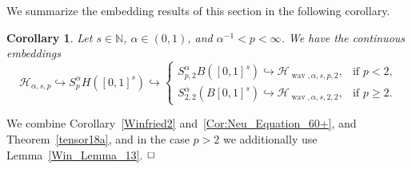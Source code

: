 \documentclass[12pt]{article}
\DeclareMathOperator{\wav}{wav}
\newtheorem{corollary}{Corollary}
\newtheorem{remark}{Remark}
\newenvironment{proof}{\begin{trivlist}
    \item[\hskip\labelsep{\it Proof.}]}{$\hfill\Box$\end{trivlist}}
\newcommand{\HH}{\mathcal{H}}
\newcommand{\N}{\mathbb{N}}
\newcommand{\mig}[1]{\textcolor{blue}{#1}}
\begin{document}

We summarize the embedding results of this section in the following corollary.

\begin{corollary}\label{DirEmb_Multi}
Let $s\in\N$, $\alpha\in (0, 1)$, and $\alpha^{-1} < p  < \infty$. We have the continuous embeddings
\begin{equation}\label{multivariate_embedding_series}
\mathcal{H}_{\alpha, s, p} \hookrightarrow S^\alpha_{p}H([0,1]^s)
\hookrightarrow 
\begin{cases}
S^\alpha_{p, 2}B([0,1]^s) \hookrightarrow \HH_{\wav,\alpha, s, p, 2}, & \text{if $p < 2$,}\\
S^\alpha_{2, 2}(B[0,1]^s) \hookrightarrow \HH_{\wav,\alpha, s, 2, 2}, & \text{if $p \ge 2$.}
\end{cases}
\end{equation}
\end{corollary}

\begin{proof}
We combine
Corollary~\ref{Winfried2} and~\ref{Cor:Neu_Equation_60+}, and Theorem~\ref{tensor18a}, and in the case $p>2$ we additionally use Lemma~\ref{Win_Lemma_13}.
\end{proof}

\end{document}
